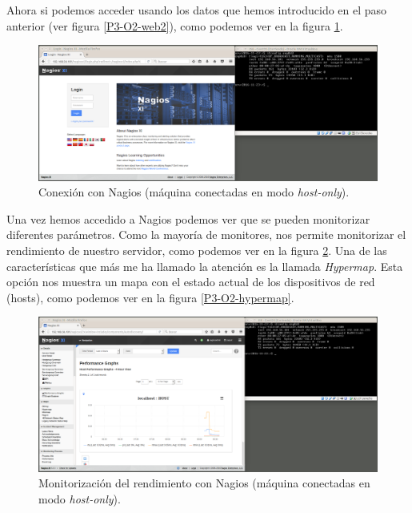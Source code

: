 \documentclass[a4paper,titlepage,12pt]{report}	%
\numberwithin{figure}{section} %
\numberwithin{table}{section} %
\begin{document}
	Ahora si podemos acceder usando los datos que hemos introducido en el paso anterior (ver figura \ref{P3-O2-web2}), como podemos ver en la figura \ref{P3-O2-conexion2}.

	\begin{figure}[H]
	   \includegraphics[width=\linewidth]{./Imagenes/P3/O2-conexion2.png}
	   \vspace{-0.5cm}
	   \caption[Conexión con Nagios (máquina conectadas en modo \textit{host-only}).]{Conexión con Nagios (máquina conectadas en modo \textit{host-only}).}
	   \label{P3-O2-conexion2}
	\end{figure}

	Una vez hemos accedido a Nagios podemos ver que se pueden monitorizar diferentes parámetros. Como la mayoría de monitores, nos permite monitorizar el rendimiento de nuestro servidor, como podemos ver en la figura \ref{P3-O2-rendimiento}. Una de las características que más me ha llamado la atención es la llamada \textit{Hypermap}. Esta opción nos muestra un mapa con el estado actual de los dispositivos de red (hosts), como podemos ver en la figura \ref{P3-O2-hypermap}.

	\begin{figure}[H]
	   \includegraphics[width=\linewidth]{./Imagenes/P3/O2-rendimiento.png}
	   \vspace{-0.5cm}
	   \caption[Monitorización del rendimiento con Nagios (máquina conectadas en modo \textit{host-only}).]{Monitorización del rendimiento con Nagios (máquina conectadas en modo \textit{host-only}).}
	   \label{P3-O2-rendimiento}
	\end{figure}
\end{document}
